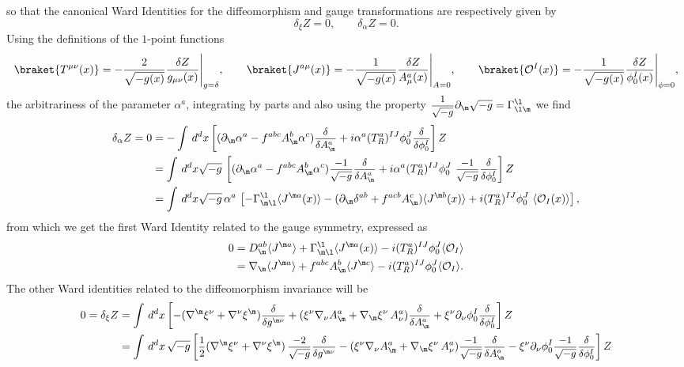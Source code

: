\documentclass[a4paper,11pt,openright,twoside]{book}
\newcommand{\mO}{\mathcal{O}}
\let\a=\alpha   \let\b=\beta   \let\g=\gamma   \let\d=\delta
\let\n=\nu      \let\x=\xi     \let\p=\pi      \let\r=\rho
\let\G=\Gamma  \let\D=\Delta \let\Q=\Theta  \let\L=\Lambda
\newcommand{\sdfrac}[2]{\mbox{\small$\displaystyle\frac{#1}{#2}$}}
\numberwithin{equation}{section}
\begin{document}
{{so that the canonical Ward Identities for the diffeomorphism and gauge transformations are respectively given by 
\begin{equation}
	\d_\x Z=0,\qquad \d_\a Z=0.
\end{equation}
Using the definitions of the $1$-point functions
\begin{align}
	\braket{T^{\mu\nu}(x)}=-\frac{2}{\sqrt{-g(x)}}\frac{\delta Z}{g_{\mu\nu}(x)}\Bigg|_{g=\d},\qquad\braket{J^{a\mu}(x)}=-\frac{1}{\sqrt{-g(x)}}\frac{\delta Z}{A^a_{\mu}(x)}\Bigg|_{A=0},\qquad \braket{\mO^I(x)}=-\frac{1}{\sqrt{-g(x)}}\frac{\delta Z}{\phi_0^I(x)}\Bigg|_{\phi=0},
\end{align}
the arbitrariness of the parameter $\a^a$, integrating by parts and also using the property $\sdfrac{1}{\sqrt{-g}}\partial_\m\sqrt{-g}=\G^\l_{\l\m}$ we find
\begin{align}
	\d_\a Z=0&=-\int\,d^dx\left[(\partial_\m\a^a-f^{abc}A_\m^b\a^c)\sdfrac{\d}{\d A_\m^a}+i\a^a(T^a_R)^{IJ}\phi^J_0\sdfrac{\d}{\d\phi_0^I}\right]Z\notag\\
	&=\int\,d^dx\sqrt{-g}\,\left[(\partial_\m\a^a-f^{abc}A_\m^b\a^c)\sdfrac{-1}{\sqrt{-g}}\sdfrac{\d}{\d A_\m^a}+i\a^a(T^a_R)^{IJ}\phi^J_0\,\,\sdfrac{-1}{\sqrt{-g}}\sdfrac{\d}{\d\phi_0^I}\right]Z\notag\\
	&=\int\,d^dx\sqrt{-g}\,\a^a\,\left[-\G^\l_{\m\l}\langle J^{\m a}(x)\rangle-(\partial_\m\d^{ab}+f^{acb}A_\m^c)\langle J^{\m b}(x)\rangle+i(T^a_R)^{IJ}\phi^J_0\,\,\langle \mathcal{O}_I(x)\rangle\right],
\end{align}
from which we get the first Ward Identity related to the gauge symmetry, expressed as
\begin{align}
	0&=D^{ab}_\m\langle J^{\m a}\rangle+\G^\l_{\m\l}\langle J^{\m a}(x)\rangle-i(T^a_R)^{IJ}\phi_0^J\langle\mathcal{O}_I\rangle\notag\\
	&=\nabla_\m\langle J^{\m a}\rangle+f^{abc}A_\m^b\langle J^{\m c}\rangle-i(T^a_R)^{IJ}\phi_0^J\langle\mathcal{O}_I\rangle\label{Ward1}.
\end{align}
The other Ward identities related to the diffeomorphism invariance will be
\begin{align}
	0=\d_\x Z&=\int\,d^dx\left[-(\nabla^\m\x^\n+\nabla^\n\x^\m)\sdfrac{\d}{\d g^{\m\n}}+(\x^\n\nabla_\n A_\m^a+\nabla_\m\x^\n\,A_\n^a)\sdfrac{\d}{\d A_\m^a}+\x^\n\partial_\n\phi_0^I\sdfrac{\d}{\d\phi_0^I}\right]Z\notag\\
	&=\int\,d^dx\,\sqrt{-g}\left[\sdfrac{1}{2}(\nabla^\m\x^\n+\nabla^\n\x^\m)\,\sdfrac{-2}{\sqrt{-g}}\sdfrac{\d}{\d g^{\m\n}}-(\x^\n\nabla_\n A_\m^a+\nabla_\m\x^\n\,A_\n^a)\sdfrac{-1}{\sqrt{-g}}\sdfrac{\d}{\d A_\m^a}-\x^\n\partial_\n\phi_0^I\sdfrac{-1}{\sqrt{-g}}\sdfrac{\d}{\d\phi_0^I}\right]Z\notag\\

\end{align}}}
\end{document}
